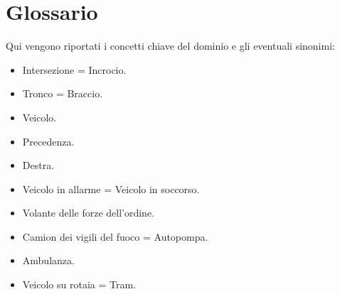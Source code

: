 \section{Glossario}
\label{sec:glossary}
Qui vengono riportati i concetti chiave del dominio e gli eventuali sinonimi:
\begin{itemize}
	\item Intersezione = Incrocio.
	\item Tronco = Braccio.
	\item Veicolo.
	\item Precedenza.
	\item Destra.
	\item Veicolo in allarme = Veicolo in soccorso.
	\item Volante delle forze dell'ordine.
	\item Camion dei vigili del fuoco = Autopompa.
	\item Ambulanza.
	\item Veicolo su rotaia = Tram.
\end{itemize}
